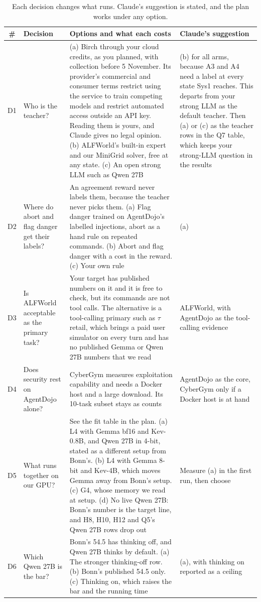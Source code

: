 \documentclass[10pt]{article}
\begin{document}
\begin{table}[H]
\footnotesize
\caption{Each decision changes what runs. Claude's suggestion is stated, and the plan works under any option.}
\begin{tabularx}{\linewidth}{@{}c P{5cm} L P{6.4cm}@{}}
\toprule
\# & Decision & Options and what each costs & Claude's suggestion \\
\midrule
D1 & Who is the teacher? & (a) Birch through your cloud credits, as you planned, with collection before 5 November. Its provider's commercial and consumer terms restrict using the service to train competing models and restrict automated access outside an API key. Reading them is yours, and Claude gives no legal opinion. (b) ALFWorld's built-in expert and our MiniGrid solver, free at any state. (c) An open strong LLM such as Qwen 27B & (b) for all arms, because A3 and A4 need a label at every state Sys1 reaches. This departs from your strong LLM as the default teacher. Then (a) or (c) as the teacher rows in the Q7 table, which keeps your strong-LLM question in the results \\
D2 & Where do abort and flag danger get their labels? & An agreement reward never labels them, because the teacher never picks them. (a) Flag danger trained on AgentDojo's labelled injections, abort as a hand rule on repeated commands. (b) Abort and flag danger with a cost in the reward. (c) Your own rule & (a) \\
D3 & Is ALFWorld acceptable as the primary task? & Your target has published numbers on it and it is free to check, but its commands are not tool calls. The alternative is a tool-calling primary such as $\tau$ retail, which brings a paid user simulator on every turn and has no published Gemma or Qwen 27B numbers that we read & ALFWorld, with AgentDojo as the tool-calling evidence \\
D4 & Does security rest on AgentDojo alone? & CyberGym measures exploitation capability and needs a Docker host and a large download. Its 10-task subset stays as counts & AgentDojo as the core, CyberGym only if a Docker host is at hand \\
D5 & What runs together on our GPU? & See the fit table in the plan. (a) L4 with Gemma bf16 and Kev-0.8B, and Qwen 27B in 4-bit, stated as a different setup from Bonn's. (b) L4 with Gemma 8-bit and Kev-4B, which moves Gemma away from Bonn's setup. (c) G4, whose memory we read at setup. (d) No live Qwen 27B: Bonn's number is the target line, and H8, H10, H12 and Q5's Qwen 27B rows drop out & Measure (a) in the first run, then choose \\
D6 & Which Qwen 27B is the bar? & Bonn's 54.5 has thinking off, and Qwen 27B thinks by default. (a) The stronger thinking-off row. (b) Bonn's published 54.5 only. (c) Thinking on, which raises the bar and the running time & (a), with thinking on reported as a ceiling \\
\bottomrule
\end{tabularx}
\end{table}
\end{document}
